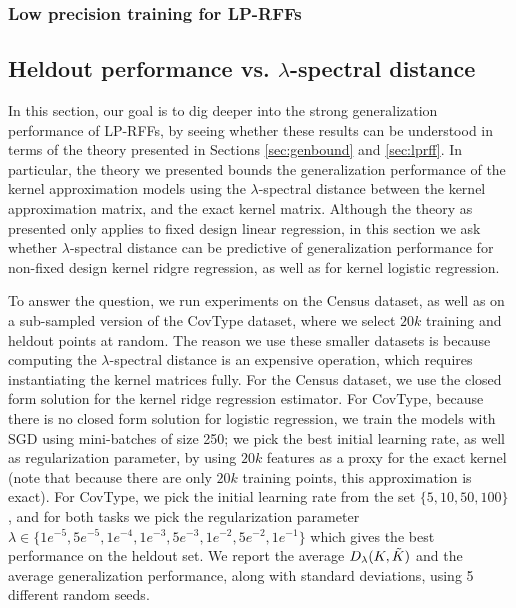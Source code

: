 \subsubsection{Low precision training for LP-RFFs}
\label{sec:lptrain}


\subsection{Heldout performance vs. $\lambda$-spectral distance}
In this section, our goal is to dig deeper into the strong generalization performance of LP-RFFs, by seeing whether these results can be understood in terms of the theory presented in Sections \ref{sec:genbound} and \ref{sec:lprff}.  In particular, the theory we presented bounds the generalization performance of the kernel approximation models using the $\lambda$-spectral distance between the kernel approximation matrix, and the exact kernel matrix.  Although the theory as presented only applies to fixed design linear regression, in this section we ask whether $\lambda$-spectral distance can be predictive of generalization performance for non-fixed design kernel ridgre regression, as well as for kernel logistic regression.

To answer the question, we run experiments on the Census dataset, as well as on a sub-sampled version of the CovType dataset, where we select $20k$ training and heldout points at random.  The reason we use these smaller datasets is because computing the $\lambda$-spectral distance is an expensive operation, which requires instantiating the kernel matrices fully.  For the Census dataset, we use the closed form solution for the kernel ridge regression estimator.  For CovType, because there is no closed form solution for logistic regression, we train the models with SGD using mini-batches of size 250; we pick the best initial learning rate, as well as regularization parameter, by using $20k$ \Nystrom features as a proxy for the exact kernel (note that because there are only $20k$ training points, this \Nystrom approximation is exact). For CovType, we pick the initial learning rate from the set $\{5, 10, 50, 100\}$, and for both tasks we pick the regularization parameter $\lambda \in \{1e^{-5}, 5e^{-5}, 1e^{-4}, 1e^{-3}, 5e^{-3}, 1e^{-2}, 5e^{-2}, 1e^{-1}\}$ which gives the best performance on the heldout set. We report the average $D_{\lambda}(K,\tilde{K})$ and the average generalization performance, along with standard deviations, using 5 different random seeds.

